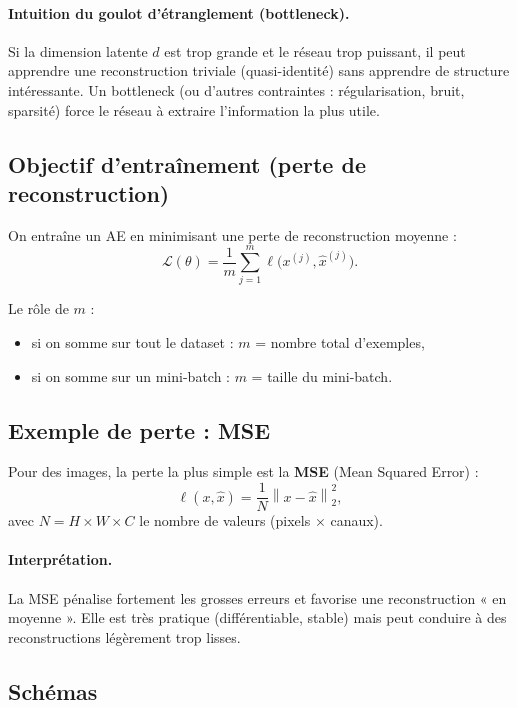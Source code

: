 \documentclass[11pt,a4paper]{article}
\newcommand{\norm}[1]{\left\lVert #1 \right\rVert}
\begin{document}
\paragraph{Intuition du goulot d'étranglement (bottleneck).}
Si la dimension latente $d$ est trop grande et le réseau trop puissant, il peut apprendre une reconstruction triviale (quasi-identité) sans apprendre de structure intéressante.
Un bottleneck (ou d'autres contraintes : régularisation, bruit, sparsité) force le réseau à extraire l'information la plus utile.

\subsection{Objectif d'entraînement (perte de reconstruction)}

On entraîne un AE en minimisant une perte de reconstruction moyenne :
\begin{equation}
  \mathcal{L}(\theta) = \frac{1}{m}\sum_{j=1}^{m} \ell\big(x^{(j)}, \hat{x}^{(j)}\big).
\end{equation}

Le rôle de $m$ :
\begin{itemize}
  \item si on somme sur tout le dataset : $m$ = nombre total d'exemples,
  \item si on somme sur un mini-batch : $m$ = taille du mini-batch.
\end{itemize}

\subsection{Exemple de perte : MSE}

Pour des images, la perte la plus simple est la \textbf{MSE} (Mean Squared Error) :
\begin{equation}
  \ell(x,\hat{x}) = \frac{1}{N} \norm{x-\hat{x}}_2^2,
\end{equation}
avec $N = H\times W\times C$ le nombre de valeurs (pixels $\times$ canaux).

\paragraph{Interprétation.}
La MSE pénalise fortement les grosses erreurs et favorise une reconstruction « en moyenne ».
Elle est très pratique (différentiable, stable) mais peut conduire à des reconstructions légèrement trop lisses.

\subsection{Schémas}
\end{document}
